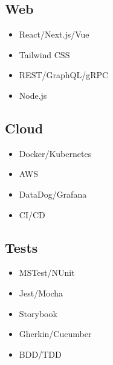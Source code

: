 \documentclass{article}
\begin{document}
\begin{paracol}{2}
\begin{leftcolumn}
    \vspace{0.5em}

    \subsection{Web}
    \begin{itemize}
      \item React/Next.js/Vue
      \item Tailwind CSS
      \item REST/GraphQL/gRPC
      \item Node.js
    \end{itemize}

    \vspace{0.5em}

    \subsection{Cloud}
    \begin{itemize}
      \item Docker/Kubernetes
      \item AWS 
      \item DataDog/Grafana
      \item CI/CD
    \end{itemize}

    \pagebreak

    \subsection{Tests}
    \begin{itemize}
      \item MSTest/NUnit
      \item Jest/Mocha
      \item Storybook
      \item Gherkin/Cucumber
      \item BDD/TDD
    \end{itemize}

    \vspace{0.5em}


\end{leftcolumn}
\end{paracol}
\end{document}

